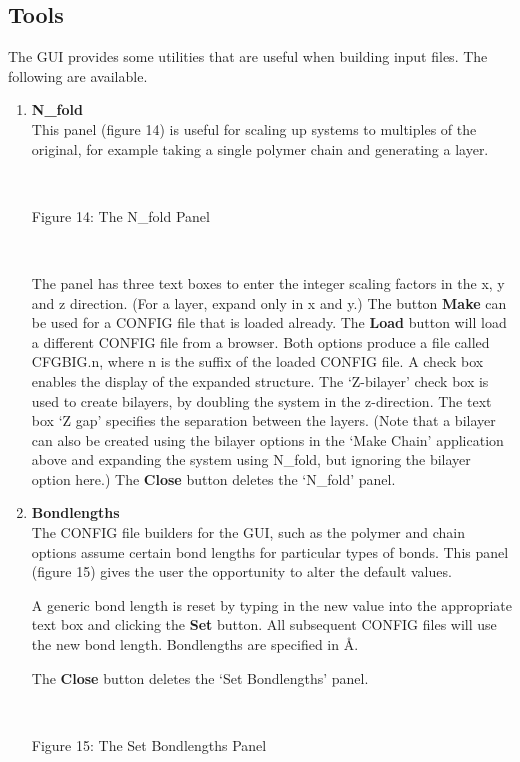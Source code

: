 \subsection{Tools}
The GUI provides some utilities that are useful when building \DD{} input files.
The following are available.
\begin{enumerate}
\item {\bf N\_fold} \\
This panel (figure 14) is useful for scaling up systems to multiples of the
original, for example taking a single polymer chain and generating a
layer.

~

\vskip 5mm
\centerline{}
\centerline{Figure 14: The N\_fold Panel}
\vskip 5mm

~

\noindent
The panel has three text boxes to enter the integer scaling factors in
the x, y and z direction. (For a layer, expand only in x and y.) The
button {\bf Make} can be used for a CONFIG file that is loaded
already. The {\bf Load} button will load a different CONFIG file from
a browser. Both options produce a file called CFGBIG.n, where n is the
suffix of the loaded CONFIG file. A check box enables the display of
the expanded structure. The `Z-bilayer' check box is used to create
bilayers, by doubling the system in the z-direction. The text box `Z
gap' specifies the separation between the layers. (Note that a bilayer
can also be created using the bilayer options in the `Make Chain'
application above and expanding the system using N\_fold, but ignoring the
bilayer option here.) The {\bf Close} button deletes the `N\_fold' panel.

\item {\bf Bondlengths} \\
The CONFIG file builders for the GUI, such as the polymer and chain
options assume certain bond lengths for particular types of
bonds. This panel (figure 15) gives the user the opportunity to alter
the default values.

A generic bond length is reset by typing in the new value into the
appropriate text box and clicking the {\bf Set} button. All subsequent
CONFIG files will use the new bond length. Bondlengths are specified
in \AA. 

The {\bf Close} button deletes the `Set Bondlengths' panel.

~

\vskip 5mm
\centerline{}
\centerline{Figure 15: The Set Bondlengths Panel}
\vskip 5mm


\end{enumerate}
